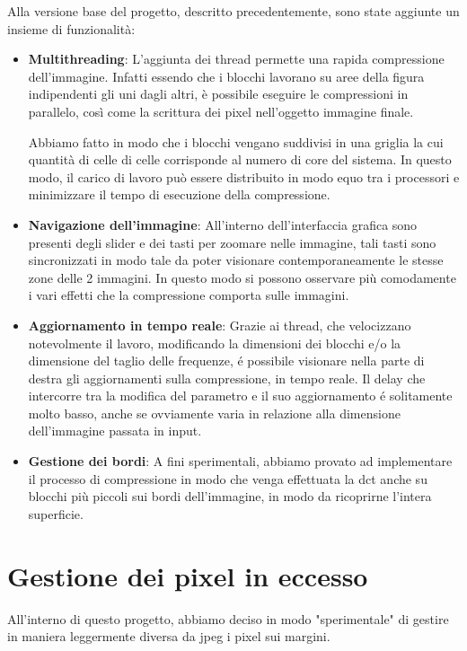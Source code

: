 Alla versione base del progetto, descritto precedentemente, sono state aggiunte un insieme di funzionalità:

\begin{itemize}
	\item \textbf{Multithreading}: L'aggiunta dei thread permette una rapida compressione dell'immagine. Infatti essendo che i blocchi lavorano su aree della figura indipendenti gli uni dagli altri, è possibile eseguire le compressioni in parallelo, così come la scrittura dei pixel nell'oggetto immagine finale.
	
	Abbiamo fatto in modo che i blocchi vengano suddivisi in una griglia la cui quantità di celle di celle corrisponde al numero di core del sistema. In questo modo, il carico di lavoro può essere distribuito in modo equo tra i processori e minimizzare il tempo di esecuzione della compressione.
	\item \textbf{Navigazione dell'immagine}: All'interno dell'interfaccia grafica sono presenti degli slider e dei tasti per zoomare nelle immagine, tali tasti sono sincronizzati in modo tale da poter visionare contemporaneamente le stesse zone delle 2 immagini. In questo modo si possono osservare più comodamente i vari effetti che la compressione comporta sulle immagini.
	\item \textbf{Aggiornamento in tempo reale}: Grazie ai thread, che velocizzano notevolmente il lavoro, modificando la dimensioni dei blocchi e/o la dimensione del taglio delle frequenze, é possibile visionare nella parte di destra gli aggiornamenti sulla compressione, in tempo reale. Il delay che intercorre tra la modifica del parametro e il suo aggiornamento é solitamente molto basso, anche se ovviamente varia in relazione alla dimensione dell'immagine passata in input.
	\item  \textbf{Gestione dei bordi}:  A fini sperimentali, abbiamo provato ad implementare il processo di compressione in modo che venga effettuata la dct anche su blocchi più piccoli sui bordi dell'immagine, in modo da ricoprirne l'intera superficie.
\end{itemize}

\section{Gestione dei pixel in eccesso}

All'interno di questo progetto, abbiamo deciso in modo "sperimentale" di gestire in maniera leggermente diversa da jpeg i pixel sui margini.

